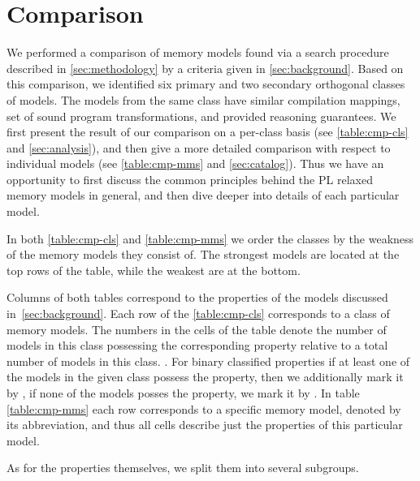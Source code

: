 \section{Comparison}

We performed a comparison of memory models 
found via a search procedure described in \cref{sec:methodology} 
by a criteria given in \cref{sec:background}. 
Based on this comparison, we identified six primary 
and two secondary orthogonal classes of models.
The models from the same class have similar compilation mappings, 
set of sound program transformations, and provided reasoning guarantees.
We first present the result of our comparison on a per-class basis 
(see \cref{table:cmp-cls} and \cref{sec:analysis}), and 
then give a more detailed comparison with respect to individual models
(see \cref{table:cmp-mms} and \cref{sec:catalog}).
Thus we have an opportunity to first discuss the common principles
behind the PL relaxed memory models in general, and then dive deeper 
into details of each particular model. 

In both \cref{table:cmp-cls} and \cref{table:cmp-mms} we order
the classes by the weakness of the memory models they consist of.  
The strongest models are located at the top rows of the table, 
while the weakest are at the bottom.  

Columns of both tables correspond to the properties 
of the models discussed in~\cref{sec:background}.
Each row of the \cref{table:cmp-cls} corresponds to a class of memory models.
The numbers in the cells of the table denote the number of models in this 
class possessing the corresponding property relative to a total number 
of models in this class. .
For binary classified properties if at least one of the models 
in the given class possess the property,
then we additionally mark it by \cmark, 
if none of the models posses the property, we mark it by \xmark.    
In table \cref{table:cmp-mms} each row corresponds to 
a specific memory model, denoted by its abbreviation, 
and thus all cells describe just the properties 
of this particular model. 

As for the properties themselves, we split them into several subgroups.

